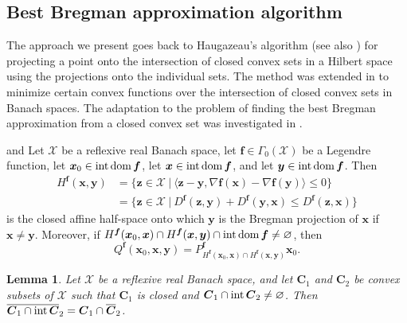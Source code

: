 \documentclass[a4paper,11pt,fleqn]{article}
\renewcommand{\leq}{\ensuremath{\leqslant}}
\newcommand{\pair}[2]{\langle{{#1},{#2}}\rangle}
\newcommand{\menge}[2]{\big\{{#1}~\big |~{#2}\big\}}
\newcommand{\XX}{\ensuremath{{\mathcal X}}}
\newcommand{\XXX}{\ensuremath{\boldsymbol{\mathcal X}}}
\newcommand{\emp}{\ensuremath{{\varnothing}}}
\newcommand{\inte}{\ensuremath{\text{\rm int}\,}}
\newcommand{\intdom}{\ensuremath{\text{\rm int\,dom}\,}}
\newtheorem{lemma}[theorem]{Lemma}
\theoremstyle{plain}{\theorembodyfont{\rmfamily}%
\newtheorem{conjecture}[theorem]{Conjecture}}
\theoremstyle{plain}{\theorembodyfont{\rmfamily}%
\newtheorem{example}[theorem]{Example}}
\theoremstyle{plain}{\theorembodyfont{\rmfamily}%
\newtheorem{remark}[theorem]{Remark}}
\theoremstyle{plain}{\theorembodyfont{\rmfamily}%
\newtheorem{algorithm}[theorem]{Algorithm}}
\theoremstyle{plain}{\theorembodyfont{\rmfamily}%
\newtheorem{condition}[theorem]{Condition}}
\theoremstyle{plain}{\theorembodyfont{\rmfamily}%
\newtheorem{definition}[theorem]{Definition}}
\theoremstyle{plain}{\theorembodyfont{\rmfamily}
\newtheorem{problem}[theorem]{Problem}}
\theoremstyle{plain}{\theorembodyfont{\rmfamily}
\newtheorem{notation}[theorem]{Notation}}
\numberwithin{equation}{section}
\begin{document}
\subsection{Best Bregman approximation algorithm}
The approach we present goes back to Haugazeau's algorithm 
\cite[Th\'eor\`eme~3-2]{Haug68} (see also
\cite[Theorem~29.3]{Livre1}) for projecting a point onto 
the intersection of closed convex sets in a Hilbert space using 
the projections onto the individual sets. The method was 
extended in \cite{Sico00} to minimize certain convex functions 
over the intersection of closed convex sets in Banach spaces. 
The adaptation to the problem of finding the best Bregman
approximation from a closed convex set was investigated in
\cite{Pams03}.

\begin{definition}
\label{d:B-haugazeau}
{\rm\cite[Definition~3.1]{Sico03} and \cite[Section~3]{Pams03}}
Let $\XXX$ be a reflexive real Banach space, let 
$\boldsymbol{f}\in\Gamma_0(\XXX)$ be a Legendre function, let 
$\boldsymbol{x}_0\in\intdom\boldsymbol{f}$, let 
$\boldsymbol{x}\in\intdom\boldsymbol{f}$, and let 
$\boldsymbol{y}\in\intdom\boldsymbol{f}$. Then
\begin{align}
\label{eKKnhf74g19a}
H^{\boldsymbol{f}}(\boldsymbol{x},\boldsymbol{y})
&=\menge{\boldsymbol{z}\in\boldsymbol{\XX}}{\pair{\boldsymbol{z}
-\boldsymbol{y}}{\nabla\boldsymbol{f}(\boldsymbol{x})
-\nabla\boldsymbol{f}(\boldsymbol{y})}\leq 0}\nonumber\\
&=\menge{\boldsymbol{z}\in\boldsymbol{\XX}}{
D^{\boldsymbol{f}}(\boldsymbol{z},\boldsymbol{y})+
D^{\boldsymbol{f}}(\boldsymbol{y},\boldsymbol{x})\leq
D^{\boldsymbol{f}}(\boldsymbol{z},\boldsymbol{x})}
\end{align}
is the closed affine half-space onto which $\boldsymbol{y}$ 
is the Bregman projection of $\boldsymbol{x}$ if
$\boldsymbol{x}\neq \boldsymbol{y}$. 
Moreover, if $H^{\boldsymbol{f}}(\boldsymbol{x}_0,\boldsymbol{x})
\cap H^{\boldsymbol{f}}(\boldsymbol{x},\boldsymbol{y})
\cap\intdom\boldsymbol{f}\neq\emp$, then
\begin{equation}
\label{e:Q}
Q^{\boldsymbol{f}}(\boldsymbol{x}_0,\boldsymbol{x},\boldsymbol{y})
=P_{H^{\boldsymbol{f}}(\boldsymbol{x}_0,\boldsymbol{x})\cap 
H^{\boldsymbol{f}}(\boldsymbol{x},\boldsymbol{y})}^{\boldsymbol{f}}
\boldsymbol{x}_0.
\end{equation}
\end{definition}

\begin{lemma} {\rm\cite[Lemma~3.2]{Sico03}}
\label{l:2002}
Let $\XXX$ be a reflexive real Banach space, and let 
$\boldsymbol{C}_1$ and $\boldsymbol{C}_2$ be convex subsets
of $\XXX$ such that $\boldsymbol{C}_1$ is closed and 
$\boldsymbol{C}_1\cap\inte\boldsymbol{C}_2\neq\emp$. Then 
$\overline{\boldsymbol{C}_1\cap\inte\boldsymbol{C}}_2=
\boldsymbol{C}_1\cap\overline{\boldsymbol{C}}_2$.
\end{lemma}
\end{document}
